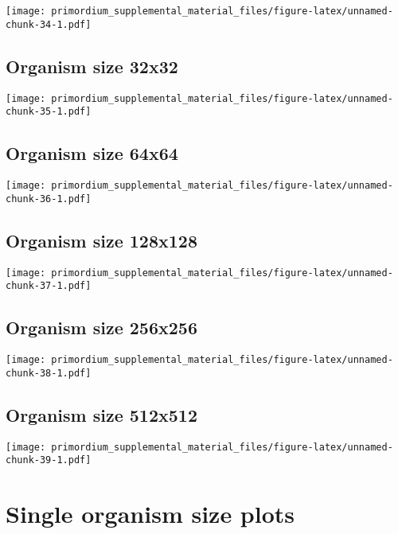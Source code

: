 \documentclass[]{book}
\begin{document}
\texttt{[image: primordium\_supplemental\_material\_files/figure-latex/unnamed-chunk-34-1.pdf]}

\hypertarget{organism-size-32x32-1}{%
\subsection{Organism size 32x32}\label{organism-size-32x32-1}}

\texttt{[image: primordium\_supplemental\_material\_files/figure-latex/unnamed-chunk-35-1.pdf]}

\hypertarget{organism-size-64x64-1}{%
\subsection{Organism size 64x64}\label{organism-size-64x64-1}}

\texttt{[image: primordium\_supplemental\_material\_files/figure-latex/unnamed-chunk-36-1.pdf]}

\hypertarget{organism-size-128x128-1}{%
\subsection{Organism size 128x128}\label{organism-size-128x128-1}}

\texttt{[image: primordium\_supplemental\_material\_files/figure-latex/unnamed-chunk-37-1.pdf]}

\hypertarget{organism-size-256x256-1}{%
\subsection{Organism size 256x256}\label{organism-size-256x256-1}}

\texttt{[image: primordium\_supplemental\_material\_files/figure-latex/unnamed-chunk-38-1.pdf]}

\hypertarget{organism-size-512x512-1}{%
\subsection{Organism size 512x512}\label{organism-size-512x512-1}}

\texttt{[image: primordium\_supplemental\_material\_files/figure-latex/unnamed-chunk-39-1.pdf]}

\hypertarget{single-organism-size-plots-2}{%
\section{Single organism size plots}\label{single-organism-size-plots-2}}
\end{document}
